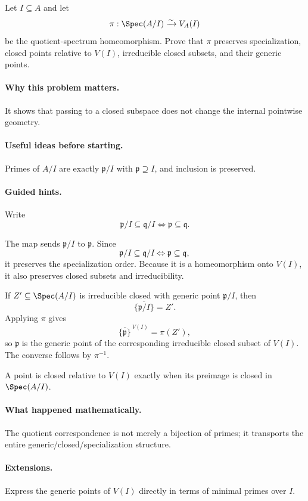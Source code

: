 \begin{problem}
Let $I\subseteq A$ and let
\[
\pi:\Spec(A/I)\xrightarrow{\sim}V_A(I)
\]
be the quotient-spectrum homeomorphism.  Prove that $\pi$ preserves specialization,
closed points relative to $V(I)$, irreducible closed subsets, and their generic points.
\end{problem}

\paragraph{Why this problem matters.}
It shows that passing to a closed subspace does not change the internal pointwise geometry.

\paragraph{Useful ideas before starting.}
Primes of $A/I$ are exactly $\mathfrak p/I$ with $\mathfrak p\supseteq I$, and inclusion
is preserved.

\paragraph{Guided hints.}
Write
\[
\mathfrak p/I\subseteq\mathfrak q/I
\iff
\mathfrak p\subseteq\mathfrak q.
\]

\begin{solution}
The map sends $\mathfrak p/I$ to $\mathfrak p$.  Since
\[
\mathfrak p/I\subseteq\mathfrak q/I
\iff
\mathfrak p\subseteq\mathfrak q,
\]
it preserves the specialization order.  Because it is a homeomorphism onto $V(I)$, it
also preserves closed subsets and irreducibility.

If $Z'\subseteq\Spec(A/I)$ is irreducible closed with generic point $\mathfrak p/I$, then
\[
\overline{\{\mathfrak p/I\}}=Z'.
\]
Applying $\pi$ gives
\[
\overline{\{\mathfrak p\}}^{\,V(I)}=\pi(Z'),
\]
so $\mathfrak p$ is the generic point of the corresponding irreducible closed subset of
$V(I)$.  The converse follows by $\pi^{-1}$.

A point is closed relative to $V(I)$ exactly when its preimage is closed in
$\Spec(A/I)$.
\end{solution}

\paragraph{What happened mathematically.}
The quotient correspondence is not merely a bijection of primes; it transports the entire
generic/closed/specialization structure.

\paragraph{Extensions.}
Express the generic points of $V(I)$ directly in terms of minimal primes over $I$.
